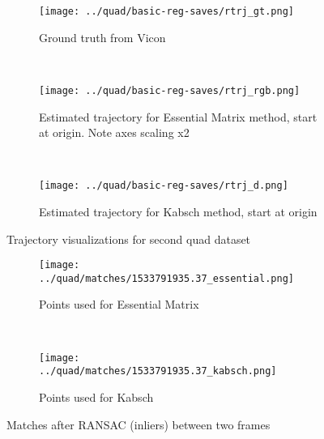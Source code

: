 \documentclass[12pt,a4paper]{article}
\begin{document}
\begin{figure}[p]
\begin{subfigure}[t]{\textwidth}
  \centering
    \texttt{[image: ../quad/basic-reg-saves/rtrj\_gt.png]}
  \caption{Ground truth from Vicon}
  \end{subfigure}
  \\
  \begin{subfigure}[t]{0.5\textwidth}
  \centering
    \texttt{[image: ../quad/basic-reg-saves/rtrj\_rgb.png]}
  \caption{Estimated trajectory for Essential Matrix method, start at origin. Note axes scaling x2}
  \end{subfigure}%
  ~
  \begin{subfigure}[t]{0.5\textwidth}
  \centering
    \texttt{[image: ../quad/basic-reg-saves/rtrj\_d.png]}
  \caption{Estimated trajectory for Kabsch method, start at origin}
  \end{subfigure}
  \caption{Trajectory visualizations for second quad dataset}
  \label{f: quad2 trj}
\end{figure}

\begin{figure}[h]
  \centering
  \begin{subfigure}[t]{\textwidth}
  \centering
  \texttt{[image: ../quad/matches/1533791935.37\_essential.png]}
  \caption{Points used for Essential Matrix}
  \end{subfigure}%
  \\
  \begin{subfigure}[t]{\textwidth}
  \centering
  \texttt{[image: ../quad/matches/1533791935.37\_kabsch.png]}
  \caption{Points used for Kabsch}
  \end{subfigure}%
  \caption{Matches after RANSAC (inliers) between two frames}
  \label{f: matches}
\end{figure}




\end{document}
